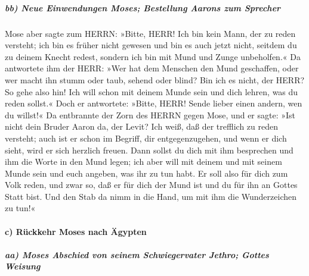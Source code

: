 \hypertarget{bb-neue-einwendungen-moses-bestellung-aarons-zum-sprecher}{%
\subparagraph{bb) Neue Einwendungen Moses; Bestellung Aarons zum
Sprecher}\label{bb-neue-einwendungen-moses-bestellung-aarons-zum-sprecher}}

 Mose aber sagte zum HERRN: »Bitte, HERR! Ich bin kein
Mann, der zu reden versteht; ich bin es früher nicht gewesen und bin es
auch jetzt nicht, seitdem du zu deinem Knecht redest, sondern ich bin
mit Mund und Zunge unbeholfen.«  Da antwortete ihm der
HERR: »Wer hat dem Menschen den Mund geschaffen, oder wer macht ihn
stumm oder taub, sehend oder blind? Bin ich es nicht, der HERR?
 So gehe also hin! Ich will schon mit deinem Munde sein
und dich lehren, was du reden sollst.«  Doch er
antwortete: »Bitte, HERR! Sende lieber einen andern, wen du willst!«
 Da entbrannte der Zorn des HERRN gegen Mose, und er
sagte: »Ist nicht dein Bruder Aaron da, der Levit? Ich weiß, daß der
trefflich zu reden versteht; auch ist er schon im Begriff, dir
entgegenzugehen, und wenn er dich sieht, wird er sich herzlich freuen.
 Dann sollst du dich mit ihm besprechen und ihm die Worte
in den Mund legen; ich aber will mit deinem und mit seinem Munde sein
und euch angeben, was ihr zu tun habt.  Er soll also für
dich zum Volk reden, und zwar so, daß er für dich der Mund ist und du
für ihn an Gottes Statt bist.  Und den Stab da nimm in
die Hand, um mit ihm die Wunderzeichen zu tun!«

\hypertarget{c-ruxfcckkehr-moses-nach-uxe4gypten}{%
\paragraph{c) Rückkehr Moses nach
Ägypten}\label{c-ruxfcckkehr-moses-nach-uxe4gypten}}

\hypertarget{aa-moses-abschied-von-seinem-schwiegervater-jethro-gottes-weisung}{%
\subparagraph{aa) Moses Abschied von seinem Schwiegervater Jethro;
Gottes
Weisung}\label{aa-moses-abschied-von-seinem-schwiegervater-jethro-gottes-weisung}}

